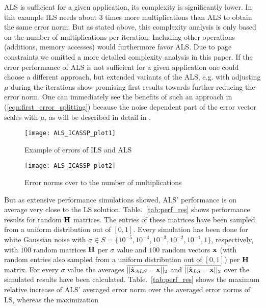 \documentclass{article}
\begin{document}
ALS is sufficient for a given application, its complexity is significantly lower. 
In this example ILS needs about $3$ times more multiplications than ALS to obtain
the same error norm. 
But as stated above,
this complexity analysis is only based on the number of multiplications per iteration. 
Including other operations (additions, memory accesses) would furthermore favor 
ALS. Due to page constraints we omitted a more detailed complexity analysis in this paper. 
If the error performance of ALS is not sufficient for 
a given application one could choose a different approach, but extended variants of the ALS, e.g. with 
adjusting $\mu$ during the iterations
show promising first results towards 
further reducing the error norm. One can immediately see the benefits of such an approach in
(\ref{eqn:first_error_splitting}) because 
the noise dependent part of the error vector scales with $\mu$, as will be
described in detail in \cite{journal}. 
\begin{figure}[tb]
\begin{center}
\texttt{[image: ALS\_ICASSP\_plot1]}
\caption{ Example of errors of ILS and ALS \label{fig:error_sin} }
\end{center}
\end{figure}
\begin{figure}[tb]
\begin{center}
\texttt{[image: ALS\_ICASSP\_plot2]}
\caption{ Error norms over to the number of multiplications \label{fig:error_sin_mul} }
\end{center}
\end{figure}
But as extensive performance simulations showed, ALS' performance is on average very close to the LS solution. 
Table.~\ref{tab:perf_res} shows performance results for random $\bf H$ matrices. 
The entries of these matrices have been sampled from a uniform distribution out of $[0,1]$. Every 
simulation has been done for white Gaussian noise with 
$\sigma \in S=\{ 10^{-5},10^{-4},10^{-3},10^{-2},10^{-1}, 1\}$, 
respectively,
with $100$ random matrices $\bf H$ per $\sigma$ value and $100$ 
random vectors $\bf x$
(with random entries also sampled from a uniform
distribution out of $[0,1]$) per $\bf H$ matrix. For every $\sigma$ 
value the averages $\overline{||\hat{\bf x}_{ALS}-{\bf x}||_2}$ and 
$\overline{||\hat{\bf x}_{LS}-{\bf x}||_2}$
over the simulated results have been calculated.
Table.~\ref{tab:perf_res} shows the maximum relative increase of ALS'
averaged error norm over the averaged error norms of LS, whereas the maximization
\end{document}
